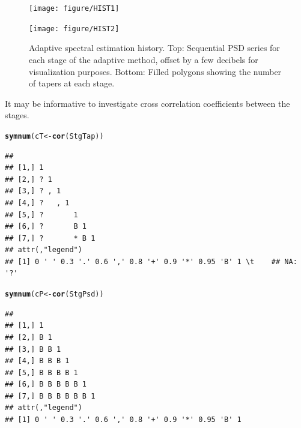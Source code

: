 \documentclass{article}\usepackage{graphicx, color}
\makeatletter
\newcommand{\hlfunctioncall}[1]{\textcolor[rgb]{0.501960784313725,0,0.329411764705882}{\textbf{#1}}}%
\newenvironment{kframe}{%
 \def\at@end@of@kframe{}%
 \ifinner\ifhmode%
  \def\at@end@of@kframe{\end{minipage}}%
  \begin{minipage}{\columnwidth}%
 \fi\fi%
 \def\FrameCommand##1{\hskip\@totalleftmargin \hskip-\fboxsep
 \colorbox{shadecolor}{##1}\hskip-\fboxsep
     \hskip-\linewidth \hskip-\@totalleftmargin \hskip\columnwidth}%
 \MakeFramed {\advance\hsize-\width
   \@totalleftmargin\z@ \linewidth\hsize
   \@setminipage}}%
 {\par\unskip\endMakeFramed%
 \at@end@of@kframe}
\newenvironment{knitrout}{}{} %
\makeatother
\begin{document}
\begin{figure}[htb!]
\begin{center}
\begin{knitrout}
\color{fgcolor}
\texttt{[image: figure/HIST1]} 

\end{knitrout}

\begin{knitrout}
\color{fgcolor}
\texttt{[image: figure/HIST2]} 

\end{knitrout}

\caption{Adaptive spectral estimation history.
Top: Sequential PSD series for each stage of the adaptive method, 
offset by a few decibels for visualization purposes.
Bottom: Filled polygons showing the number of tapers at each stage.
}
\label{fig:psdhist}
\end{center}
\end{figure}

It may be informative to investigate cross correlation
coefficients between the stages.
\begin{knitrout}
\color{fgcolor}\begin{kframe}
\begin{alltt}
\hlfunctioncall{symnum}(cT <- \hlfunctioncall{cor}(StgTap))
\end{alltt}


{\ttfamily\noindent\color{warningcolor}{\#\# Warning: the standard deviation is zero}}\begin{verbatim}
##                   
## [1,] 1            
## [2,] ? 1          
## [3,] ? , 1        
## [4,] ?   , 1      
## [5,] ?       1    
## [6,] ?       B 1  
## [7,] ?       * B 1
## attr(,"legend")
## [1] 0 ' ' 0.3 '.' 0.6 ',' 0.8 '+' 0.9 '*' 0.95 'B' 1 \t    ## NA: '?'
\end{verbatim}
\end{kframe}
\end{knitrout}

\begin{knitrout}
\color{fgcolor}\begin{kframe}
\begin{alltt}
\hlfunctioncall{symnum}(cP <- \hlfunctioncall{cor}(StgPsd))
\end{alltt}
\begin{verbatim}
##                   
## [1,] 1            
## [2,] B 1          
## [3,] B B 1        
## [4,] B B B 1      
## [5,] B B B B 1    
## [6,] B B B B B 1  
## [7,] B B B B B B 1
## attr(,"legend")
## [1] 0 ' ' 0.3 '.' 0.6 ',' 0.8 '+' 0.9 '*' 0.95 'B' 1
\end{verbatim}
\end{kframe}
\end{knitrout}
\end{document}
